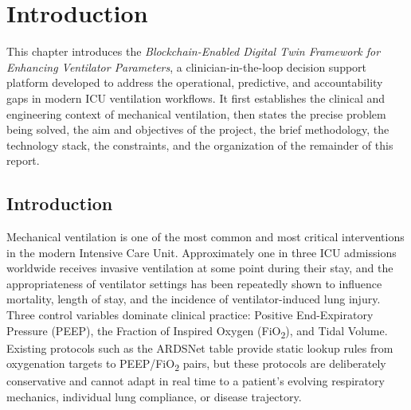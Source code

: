 \documentclass[12pt,a4paper,oneside]{report}
\begin{document}
\renewcommand{\listfigurename}{\centering LIST OF FIGURES}
\listoffigures
\newpage

\renewcommand{\listtablename}{\centering LIST OF TABLES}
\listoftables
\newpage

\setcounter{page}{1}

\chapter{Introduction}

This chapter introduces the \textit{Blockchain-Enabled Digital Twin Framework for Enhancing Ventilator Parameters}, a clinician-in-the-loop decision support platform developed to address the operational, predictive, and accountability gaps in modern ICU ventilation workflows. It first establishes the clinical and engineering context of mechanical ventilation, then states the precise problem being solved, the aim and objectives of the project, the brief methodology, the technology stack, the constraints, and the organization of the remainder of this report.

\section{Introduction}
Mechanical ventilation is one of the most common and most critical interventions in the modern Intensive Care Unit. Approximately one in three ICU admissions worldwide receives invasive ventilation at some point during their stay, and the appropriateness of ventilator settings has been repeatedly shown to influence mortality, length of stay, and the incidence of ventilator-induced lung injury. Three control variables dominate clinical practice: Positive End-Expiratory Pressure (PEEP), the Fraction of Inspired Oxygen (FiO\textsubscript{2}), and Tidal Volume. Existing protocols such as the ARDSNet table provide static lookup rules from oxygenation targets to PEEP/FiO\textsubscript{2} pairs, but these protocols are deliberately conservative and cannot adapt in real time to a patient's evolving respiratory mechanics, individual lung compliance, or disease trajectory.
\end{document}
